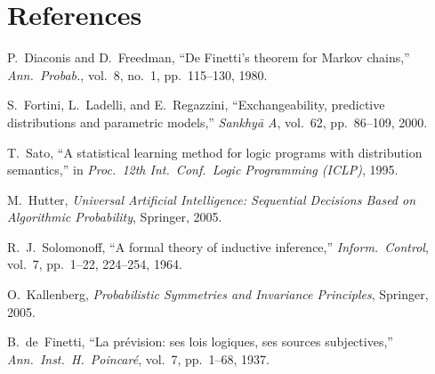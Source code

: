 \documentclass[11pt]{article}
\theoremstyle{definition}
\begin{document}
\section*{References}

\begin{enumerate}[leftmargin=2em, label={[\arabic*]}]

\item P.~Diaconis and D.~Freedman, ``De Finetti's theorem for Markov
  chains,'' \emph{Ann.\ Probab.}, vol.~8, no.~1, pp.~115--130, 1980.

\item S.~Fortini, L.~Ladelli, and E.~Regazzini, ``Exchangeability,
  predictive distributions and parametric models,''
  \emph{Sankhy\=a A}, vol.~62, pp.~86--109, 2000.

\item T.~Sato, ``A statistical learning method for logic programs with
  distribution semantics,'' in \emph{Proc.\ 12th Int.\ Conf.\ Logic
  Programming (ICLP)}, 1995.

\item M.~Hutter, \emph{Universal Artificial Intelligence: Sequential
  Decisions Based on Algorithmic Probability}, Springer, 2005.

\item R.~J.~Solomonoff, ``A formal theory of inductive inference,''
  \emph{Inform.\ Control}, vol.~7, pp.~1--22, 224--254, 1964.

\item O.~Kallenberg, \emph{Probabilistic Symmetries and Invariance
  Principles}, Springer, 2005.

\item B.~de~Finetti, ``La pr\'evision: ses lois logiques, ses sources
  subjectives,'' \emph{Ann.\ Inst.\ H.\ Poincar\'e}, vol.~7,
  pp.~1--68, 1937.

\end{enumerate}
\end{document}
